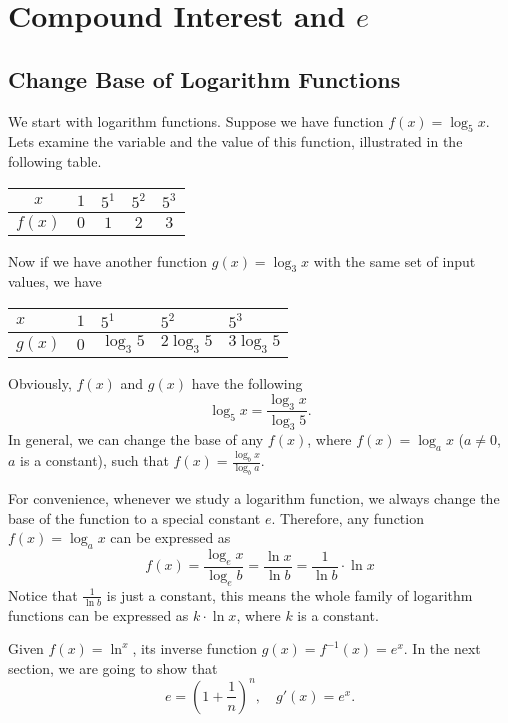 \documentclass[11pt, oneside]{article}   	%
\begin{document}
\section{Compound Interest and $e$}
\subsection{Change Base of Logarithm Functions}
We start with logarithm functions. Suppose we have function $f(x)=\log_5x$. Lets examine the variable and the value of this function, illustrated in the following table.

\renewcommand{\arraystretch}{2}
\begin{center}
\begin{tabular}{|c|c|c|c|c|}
\hline
$x$ & $1$ & $5^1$ & $5^2$ & $5^3$\\
\hline
$f(x)$ & $0$ & $1$ & $2$ & $3$\\
\hline
\end{tabular}
\end{center}

Now if we have another function $g(x)=\log_3x$ with the same set of input values, we have

\renewcommand{\arraystretch}{2}
\begin{center}
\begin{tabular}{|>{\centering}p{1cm}|>{\centering}p{1cm}|>{\centering}p{1cm}|>{\centering}p{1cm}|>{\centering\arraybackslash}p{1cm}|}
\hline
$x$ & $1$ & $5^1$ & $5^2$ & $5^3$\\
\hline
$g(x)$ & $0$ & $\log_3 5$ & $2\log_3 5$ & $3 \log_3 5$\\
\hline
\end{tabular}
\end{center}
Obviously, $f(x)$ and $g(x)$ have the following
\[\log_5 x = \frac{\log_3 x}{\log_3 5} .\]
In general, we can change the base of any $f(x)$, where $f(x) = \log_a x$ ($a \ne 0$, $a$ is a constant), such that 
$f(x)=\frac{\log_b x}{\log_b a}$. 

For convenience, whenever we study a logarithm function, we always change the base of the function to a special constant  $e$. Therefore, any function $f(x)=\log_a x$ can be expressed as \[f(x)=\frac{\log_e x}{\log_e b}= \frac{\ln x}{\ln b}= \frac {1}{\ln b}\cdot \ln x\]
Notice that $\frac{1}{\ln b}$ is just a constant, this means the whole family of logarithm functions can be expressed as $k \cdot \ln x$, where $k$ is a constant.

Given $f(x)=\ln^x$, its inverse function $g(x)=f^{-1}(x)=e^x$. In the next section, we are going to show that 
\[e=\left(1+\frac{1}{n}\right)^n, \quad g'(x)=e^x.\]
\end{document}
